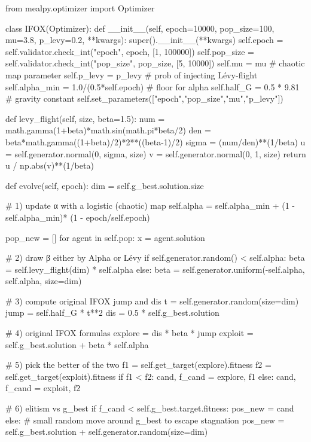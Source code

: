 from mealpy.optimizer import Optimizer


class IFOX(Optimizer):
    def __init__(self, epoch=10000, pop_size=100, mu=3.8, p_levy=0.2, **kwargs):
        super().__init__(**kwargs)
        self.epoch      = self.validator.check_int("epoch",    epoch,    [1, 100000])
        self.pop_size   = self.validator.check_int("pop_size", pop_size, [5, 10000])
        self.mu         = mu                  # chaotic map parameter
        self.p_levy     = p_levy              # prob of injecting Lévy-flight
        self.alpha_min  = 1.0/(0.5*self.epoch)  # floor for alpha
        self.half_G     = 0.5 * 9.81          # gravity constant
        self.set_parameters(["epoch","pop_size","mu","p_levy"])

    def levy_flight(self, size, beta=1.5):
        num   = math.gamma(1+beta)*math.sin(math.pi*beta/2)
        den   = beta*math.gamma((1+beta)/2)*2**((beta-1)/2)
        sigma = (num/den)**(1/beta)
        u = self.generator.normal(0, sigma, size)
        v = self.generator.normal(0, 1,     size)
        return u / np.abs(v)**(1/beta)

    def evolve(self, epoch):
        dim = self.g_best.solution.size

        # 1) update α with a logistic (chaotic) map
        self.alpha = self.alpha_min + (1 - self.alpha_min)* (1 - epoch/self.epoch)
  

        pop_new = []
        for agent in self.pop:
            x = agent.solution

            # 2) draw β either by Alpha or Lévy
            if self.generator.random() < self.alpha:
                beta = self.levy_flight(dim) * self.alpha
            else:
                beta = self.generator.uniform(-self.alpha, self.alpha, size=dim)

            # 3) compute original IFOX jump and dis
            t     = self.generator.random(size=dim)
            jump  = self.half_G * t**2
            dis   = 0.5 * self.g_best.solution

            # 4) original IFOX formulas
            explore = dis * beta * jump
            exploit = self.g_best.solution + beta * self.alpha

            # 5) pick the better of the two
            f1 = self.get_target(explore).fitness
            f2 = self.get_target(exploit).fitness
            if f1 < f2:
                cand, f_cand = explore, f1
            else:
                cand, f_cand = exploit, f2

            # 6) elitism vs g_best
            if f_cand < self.g_best.target.fitness:
                pos_new = cand
            else:
                # small random move around g_best to escape stagnation
                pos_new = self.g_best.solution + self.generator.random(size=dim)

